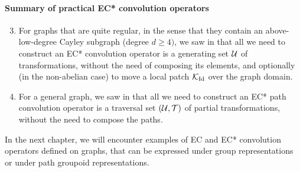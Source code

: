 \paragraph{Summary of practical EC* convolution operators}
\begin{enumerate}
  \setcounter{enumi}{2}
\item For graphs that are quite regular, in the sense that they contain an above-low-degree Cayley subgraph (degree $d \geq 4)$, we saw in  that all we need to construct an EC* convolution operator is a generating set $\mathcal{U}$ of transformations, without the need of composing its elements, and optionally (in the non-abelian case) to move a local patch $\mathcal{K}_{\operatorname{Id}}$ over the graph domain.
\item For a general graph, we saw in  that all we need to construct an EC* path convolution operator is a traversal set $(\mathcal{U}, \mathcal{T})$ of partial transformations, without the need to compose the paths.
\end{enumerate}

In the next chapter, we will encounter examples of EC and EC* convolution operators defined on graphs, that can be expressed under group representations or under path groupoid representations.

